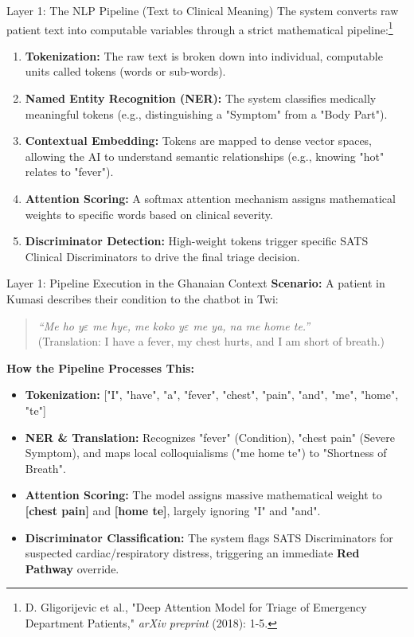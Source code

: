 \documentclass[11pt, aspectratio=169]{beamer}
\begin{document}
	\begin{frame}{Layer 1: The NLP Pipeline (Text to Clinical Meaning)}
		The system converts raw patient text into computable variables through a strict mathematical pipeline:\footnote{D. Gligorijevic et al., "Deep Attention Model for Triage of Emergency Department Patients," \textit{arXiv preprint} (2018): 1-5.}
		\vspace{0.2cm}
		\begin{enumerate}
			\item \textbf{Tokenization:} The raw text is broken down into individual, computable units called tokens (words or sub-words).
			\item \textbf{Named Entity Recognition (NER):} The system classifies medically meaningful tokens (e.g., distinguishing a "Symptom" from a "Body Part").
			\item \textbf{Contextual Embedding:} Tokens are mapped to dense vector spaces, allowing the AI to understand semantic relationships (e.g., knowing "hot" relates to "fever").
			\item \textbf{Attention Scoring:} A softmax attention mechanism assigns mathematical weights to specific words based on clinical severity.
			\item \textbf{Discriminator Detection:} High-weight tokens trigger specific SATS Clinical Discriminators to drive the final triage decision.
		\end{enumerate}
	\end{frame}
	
	\begin{frame}{Layer 1: Pipeline Execution in the Ghanaian Context}
		\textbf{Scenario:} A patient in Kumasi describes their condition to the chatbot in Twi:
		\begin{quote}
		\textit{``Me ho y$\varepsilon$ me hye, me koko y$\varepsilon$ me ya, na me home te.''} \\
			\small{(Translation: I have a fever, my chest hurts, and I am short of breath.)}
		\end{quote}
		
		\vspace{0.1cm}
		\textbf{How the Pipeline Processes This:}
		\begin{itemize}
			\item \textbf{Tokenization:} ["I", "have", "a", "fever", "chest", "pain", "and", "me", "home", "te"]
			\item \textbf{NER \& Translation:} Recognizes "fever" (Condition), "chest pain" (Severe Symptom), and maps local colloquialisms ("me home te") to "Shortness of Breath".
			\item \textbf{Attention Scoring:} The model assigns massive mathematical weight to \textbf{[chest pain]} and \textbf{[home te]}, largely ignoring "I" and "and".
			\item \textbf{Discriminator Classification:} The system flags SATS Discriminators for suspected cardiac/respiratory distress, triggering an immediate \textcolor{triageRed}{\textbf{Red Pathway}} override.
		\end{itemize}
	\end{frame}
	
\end{document}
